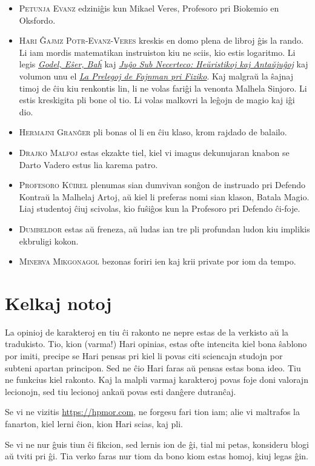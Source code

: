 \begin{itemize}
\item \textsc{Petunja Evanz} edziniĝis kun Mikael Veres, Profesoro pri Biokemio en Oksfordo.
\item \textsc{Hari Ĝajmz Potr-Evanz-Veres} kreskis en domo plena de libroj ĝis la rando.
  Li iam mordis matematikan instruiston kiu ne sciis, kio estis logaritmo.
  Li legis \href{https://books.google.com/books?vid=ISBN9780465026562}{\emph{Godel, Eŝer, Baĥ}}
  kaj \href{https://books.google.com/books?vid=ISBN9780521284141}{\emph{Juĝo Sub Necerteco: Heŭristikoj kaj Antaŭjuĝoj}}
  kaj volumon unu el \href{https://books.google.com/books?vid=ISBN9780201021158}{\emph{La Prelegoj de Fajnman pri Fiziko}}.
  Kaj malgraŭ la ŝajnaj timoj de ĉiu kiu renkontis lin, li ne volas fariĝi la venonta Malhela Sinjoro.
  Li estis kreskigita pli bone ol tio.
  Li volas malkovri la leĝojn de magio kaj iĝi dio.
\item \textsc{Hermajni Granĝer} pli bonas ol li en ĉiu klaso, krom rajdado de balailo.
\item \textsc{Drajko Malfoj} estas ekzakte tiel, kiel vi imagus dekunujaran knabon se Darto Vadero estus lia karema patro.
\item \textsc{Profesoro Kŭirel} plenumas sian dumvivan sonĝon de instruado pri Defendo Kontraŭ la Malhelaj Artoj, aŭ kiel li preferas nomi sian klason, Batala Magio.
  Liaj studentoj ĉiuj scivolas, kio fuŝiĝos kun la Profesoro pri Defendo ĉi-foje.
\item \textsc{Dumbeldor} estas aŭ freneza, aŭ ludas ian tre pli profundan ludon kiu implikis ekbruligi kokon.
\item \textsc{Minerva Mikgonagol} bezonas foriri ien kaj krii private por iom da tempo.
\end{itemize}

%
%

\section*{Kelkaj notoj}

La opinioj de karakteroj en tiu ĉi rakonto ne nepre estas de la verkisto aŭ la tradukisto.
Tio, kion (varma!) Hari opinias, estas ofte intencita kiel bona ŝablono por imiti, precipe se Hari pensas pri kiel li povas citi sciencajn studojn por subteni apartan principon.
Sed ne ĉio Hari faras aŭ pensas estas bona ideo.
Tiu ne funkcius kiel rakonto.
Kaj la malpli varmaj karakteroj povas foje doni valorajn lecionojn, sed tiu lecionoj ankaŭ povas esti danĝere dutranĉaj.

Se vi ne vizitis \url{https://hpmor.com}, ne forgesu fari tion iam; alie vi maltrafos la fanarton, kiel lerni ĉion, kion Hari scias, kaj pli.

Se vi ne nur ĝuis tiun ĉi fikcion, sed lernis ion de ĝi, tial mi petas, konsideru blogi aŭ tviti pri ĝi.
Tia verko faras nur tiom da bono kiom estas homoj, kiuj legas ĝin.

